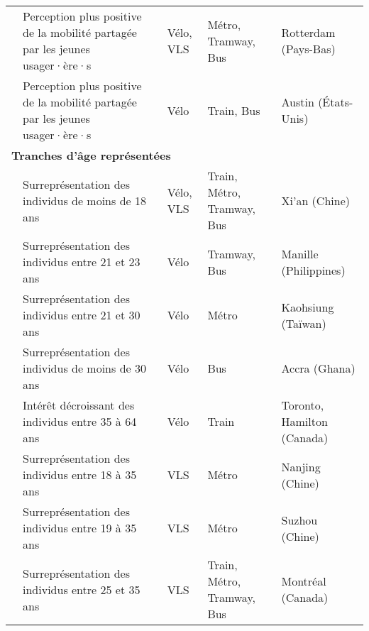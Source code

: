 \begin{longtable}{p{3cm}p{4cm}p{1.5cm}p{1.8cm}p{2.3cm}}
    \small{\textcite{montes_shared_2023}}\index{Montes, Alejandro|pagebf} & \small{Perception plus positive de la mobilité partagée par les jeunes usager·ère·s} & \small{Vélo, VLS} & \small{Métro, Tramway, Bus} & \small{Rotterdam (Pays-Bas)}\\
    \small{\textcite{li_exploring_2017}}\index{Li, Wenxiang|pagebf} & \small{Perception plus positive de la mobilité partagée par les jeunes usager·ère·s} & \small{Vélo} & \small{Train, Bus} & \small{Austin (États-Unis)}\\
    \hline
\multicolumn{5}{l}{\textbf{Tranches d'âge représentées}}\\
    \small{\textcite{yang_bike-and-ride_2014}}\index{Yang, Liu|pagebf}\index{Yang, Liu|pagebf} & \small{Surreprésentation des individus de moins de 18 ans} & \small{Vélo, VLS} & \small{Train, Métro, Tramway, Bus} & \small{Xi'an (Chine)}\\
    \small{\textcite{fillone_i_2018}}\index{Fillone, Alexis|pagebf} & \small{Surreprésentation des individus entre 21 et 23 ans} & \small{Vélo} & \small{Tramway, Bus} & \small{Manille (Philippines)}\\
    \small{\textcite{cheng_evaluating_2012}}\index{Cheng, Yung-Hsiang|pagebf} & \small{Surreprésentation des individus entre 21 et 30 ans} & \small{Vélo} & \small{Métro} & \small{Kaohsiung (Taïwan)}\\
    \small{\textcite{quarshie_integrating_2007}}\index{Quarshie, Magnus|pagebf} & \small{Surreprésentation des individus de moins de 30 ans} & \small{Vélo} & \small{Bus} & \small{Accra (Ghana)}\\
    \small{\textcite{ravensbergen_biking_2018}}\index{Ravensbergen, Léa|pagebf} & \small{Intérêt décroissant des individus entre 35 à 64 ans} & \small{Vélo} & \small{Train} & \small{Toronto, Hamilton (Canada)}\\
    \small{\textcite{liu_understanding_2020}}\index{Liu, Yang|pagebf} & \small{Surreprésentation des individus entre 18 à 35 ans} & \small{VLS} & \small{Métro} & \small{Nanjing (Chine)}\\
    \small{\textcite{ma_measuring_2018}}\index{Ma, Xinwei|pagebf} & \small{Surreprésentation des individus entre 19 à 35 ans} & \small{VLS} & \small{Métro} & \small{Suzhou (Chine)}\\
    \small{\textcite{bachand-marleau_much-anticipated_2011}}\index{Bachand-Marleau, Julie|pagebf} & \small{Surreprésentation des individus entre 25 et 35 ans} & \small{VLS} & \small{Train, Métro, Tramway, Bus} & \small{Montréal (Canada)}\\

\end{longtable}
